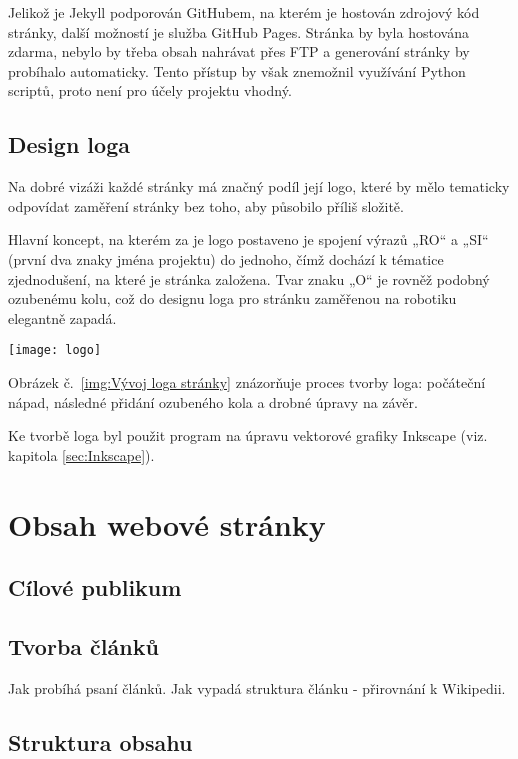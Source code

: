 \documentclass[a4paper, 12pt]{article}
\begin{document}
  Jelikož je Jekyll podporován GitHubem, na kterém je hostován zdrojový kód stránky, další možností je služba GitHub Pages\cite{github-pages}. Stránka by byla hostována zdarma, nebylo by třeba obsah nahrávat přes FTP a generování stránky by probíhalo automaticky. Tento přístup by však znemožnil využívání Python scriptů, proto není pro účely projektu vhodný.


  \subsection{Design loga}
  Na dobré vizáži každé stránky má značný podíl její logo, které by mělo tematicky odpovídat zaměření stránky bez toho, aby působilo příliš složitě.

  Hlavní koncept, na kterém za je logo postaveno je spojení výrazů „RO“ a „SI“ (první dva znaky jména projektu) do jednoho, čímž dochází k tématice zjednodušení, na které je stránka založena. Tvar znaku „O“ je rovněž podobný ozubenému kolu, což do designu loga pro stránku zaměřenou na robotiku elegantně zapadá.

  \begin{center}
    \texttt{[image: logo]}
    \label{img:Vývoj loga stránky}
  \end{center}

  Obrázek č.~\ref{img:Vývoj loga stránky} znázorňuje proces tvorby loga: počáteční nápad, následné přidání ozubeného kola a drobné úpravy na závěr.

  Ke tvorbě loga byl použit program na úpravu vektorové grafiky Inkscape (viz. kapitola \ref{sec:Inkscape}).


  \section{Obsah webové stránky}

  \subsection{Cílové publikum}

  \subsection{Tvorba článků}
  Jak probíhá psaní článků.
  Jak vypadá struktura článku - přirovnání k Wikipedii.

  \subsection{Struktura obsahu}
\end{document}
